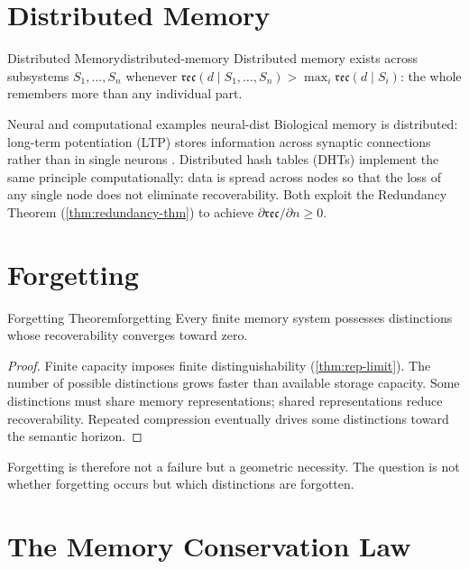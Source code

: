 \documentclass[12pt,twoside,openright]{book}
\newcommand{\csicon} {\marginpar{\tiny\color{DistBlue}\faCode}}
\newcommand{\bioicon}{\marginpar{\tiny\color{DistTeal}\faDna}}
\newcommand{\reco}{\mathfrak{rec}}
\begin{document}
\section{Distributed Memory}
\label{sec:ch6-distributed}

\begin{definition}{Distributed Memory}{distributed-memory}
  Distributed memory exists across subsystems
  $S_1, \ldots, S_n$ whenever
  $\reco(d \mid S_1, \ldots, S_n)
   > \max_i \reco(d \mid S_i)$:
  the whole remembers more than any individual part.
\end{definition}

\begin{remark}{Neural and computational examples}%
  {neural-dist}
  \bioicon\csicon
  Biological memory is distributed: long-term potentiation
  (LTP) stores information across synaptic connections
  rather than in single neurons \parencite{dayan2001}.
  Distributed hash tables (DHTs) implement the same
  principle computationally: data is spread across nodes
  so that the loss of any single node does not eliminate
  recoverability. Both exploit the Redundancy Theorem
  (\cref{thm:redundancy-thm}) to achieve
  $\partial\reco/\partial n \ge 0$.
\end{remark}

\section{Forgetting}
\label{sec:ch6-forgetting}

\begin{theorem}{Forgetting Theorem}{forgetting}
  Every finite memory system possesses distinctions
  whose recoverability converges toward zero.
\end{theorem}

\begin{proof}
  Finite capacity imposes finite distinguishability
  (\cref{thm:rep-limit}). The number of possible
  distinctions grows faster than available storage
  capacity. Some distinctions must share memory
  representations; shared representations reduce
  recoverability. Repeated compression eventually drives
  some distinctions toward the semantic horizon.
\end{proof}

Forgetting is therefore not a failure but a geometric
necessity. The question is not whether forgetting occurs
but which distinctions are forgotten.

\section{The Memory Conservation Law}
\label{sec:ch6-conservation}
\end{document}
